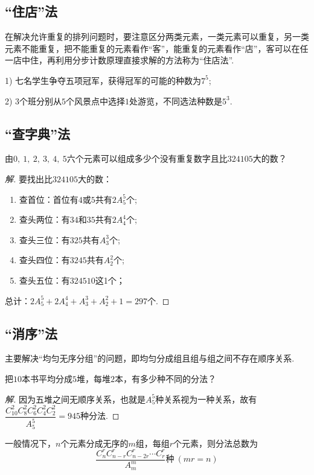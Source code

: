 \documentclass{BHCexam}
\begin{document}
\subsection{“住店”法}
在解决允许重复的排列问题时，要注意区分两类元素，一类元素可以重复，另一类元素不能重复，把不能重复的元素看作“客”，能重复的元素看作“店”，客可以在任一店中住，再利用分步计数原理直接求解的方法称为“住店法”.\par
\begin{example}
1) 七名学生争夺五项冠军，获得冠军的可能的种数为$ 7^5 $;\par
\hspace{1.2em}2) $3$个班分别从$ 5 $个风景点中选择$ 1 $处游览，不同选法种数是$ 5^3 .$
\end{example}
\subsection{   “查字典”法}
\begin{example}
 由$ 0,~1,~2,~3,~4,~5 $六个元素可以组成多少个没有重复数字且比$ 324105 $大的数？
\end{example}
\begin{proof}[解]
要找出比$ 324105 $大的数：
\begin{enumerate}[1)]
\item 查首位：首位有$4$或$5$共有$ 2A_5^5 $个;
\item 查头两位：有$34$和$35$共有$ 2A_4^4 $个;
\item 查头三位：有$ 325 $共有$ A_3^3 $个;
\item 查头四位：有$ 3245 $共有$ A_2^2 $个;
\item 查头五位：有$ 324510 $这1个；
\end{enumerate}
总计：$ 2A_5^5+2A_4^4+A_3^3+A_2^2+1=297 $个.
\end{proof}
\subsection{   “消序”法}
 主要解决“均匀无序分组”的问题，即均匀分成组且组与组之间不存在顺序关系.\par
\begin{example}
把$ 10 $本书平均分成$ 5 $堆，每堆$ 2 $本，有多少种不同的分法？
\end{example}
\begin{proof}[解]
因为五堆之间无顺序关系，也就是$ A_5^5 $种关系视为一种关系，故有$ \dfrac{C_{10}^2C_8^2C_6^2C_4^2C_2^2}{A_5^5}=945 $种分法.
\end{proof}
{\kaishu 一般情况下，$ n $个元素分成无序的$ m $组，每组$ r $个元素，则分法总数为\[\dfrac{C_n^rC_{n-r}^rC_{n-2r}^r\cdots C_r^r}{A_m^m}\text{种}~(mr=n)\]}
\end{document}
